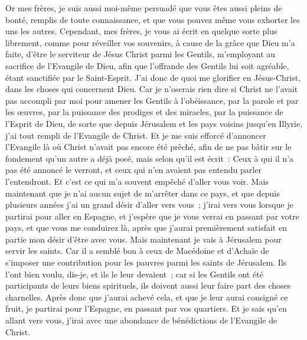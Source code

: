 \begin{multicols}{2}
 Or mes frères, je suis aussi moi-même persuadé que vous êtes aussi pleins de bonté, remplis de toute connaissance, et que vous pouvez même vous exhorter les uns les autres.
Cependant, mes frères, je vous ai écrit en quelque sorte plus librement, comme pour réveiller vos souvenirs, à cause de la grâce que Dieu m'a faite,
d'être le serviteur de Jésus Christ parmi les Gentils, m'employant au sacrifice de l'Evangile de Dieu, afin que l'offrande des Gentils lui soit agréable, étant sanctifiée par le Saint-Esprit.
J'ai donc de quoi me glorifier en Jésus-Christ, dans les choses qui concernent Dieu.
Car je n'oserais rien dire si Christ ne l’avait pas accompli par moi pour amener les Gentils à l'obéissance, par la parole et par les œuvres,
par la puissance des prodiges et des miracles, par la puissance de l'Esprit de Dieu, de sorte que depuis Jérusalem et les pays voisins jusqu'en Illyrie, j'ai tout rempli de l'Evangile de Christ.
Et je me suis efforcé d'annoncer l'Evangile là où Christ n'avait pas encore été prêché, afin de ne pas bâtir sur le fondement qu'un autre a déjà posé,
mais selon qu'il est écrit~: Ceux à qui il n'a pas été annoncé le verront, et ceux qui n'en avaient pas entendu parler l'entendront.
Et c'est ce qui m'a souvent empêché d'aller vous voir.
Mais maintenant que je n'ai aucun sujet de m'arrêter dans ce pays, et que depuis plusieurs années j'ai un grand désir d'aller vers vous~;
j'irai vers vous lorsque je partirai pour aller en Espagne, et j'espère que je vous verrai en passant par votre pays, et que vous me conduirez là, après que j'aurai premièrement satisfait en partie mon désir d'être avec vous.
Mais maintenant je vais à Jérusalem pour servir les saints.
Car il a semblé bon à ceux de Macédoine et d'Achaïe de s'imposer une contribution pour les pauvres parmi les saints de Jérusalem.
Ils l'ont bien voulu, dis-je, et ils le leur devaient~; car si les Gentils ont été participants de leurs biens spirituels, ils doivent aussi leur faire part des choses charnelles.
Après donc que j'aurai achevé cela, et que je leur aurai consigné ce fruit, je partirai pour l'Espagne, en passant par vos quartiers.
Et je sais qu'en allant vers vous, j'irai avec une abondance de bénédictions de l'Evangile de Christ.

\end{multicols}
